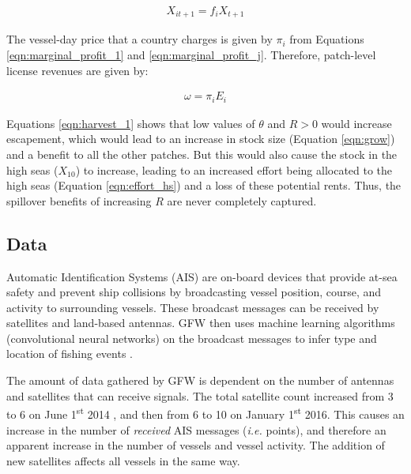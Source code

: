 \documentclass[9p,twocolumn,twoside,lineno]{pnas-new}
\begin{document}
\begin{scriptsize}
\begin{figure}[H]	
	\begin{align}
	X_{it+1} = f_iX_{t+1}
	\label{eqn:disperse}
	\end{align}
\end{figure}

The vessel-day price that a country charges is given by $\pi_i$ from Equations \ref{eqn:marginal_profit_1} and \ref{eqn:marginal_profit_j}. Therefore, patch-level license revenues are given by:

\begin{figure}[H]	
	\begin{align}
	\omega = \pi_iE_i
	\label{eqn:license_revenue}
	\end{align}
\end{figure}

Equations \ref{eqn:harvest_1} shows that low values of $\theta$ and $R > 0$ would increase escapement, which would lead to an increase in stock size (Equation \ref{eqn:grow}) and a benefit to all the other patches. But this would also cause the stock in the high seas ($X_{10}$) to increase, leading to an increased effort being allocated to the high seas (Equation \ref{eqn:effort_hs}) and a loss of these potential rents. Thus, the spillover benefits of increasing $R$ are never completely captured.

\subsection{Data}

Automatic Identification Systems (AIS) are on-board devices that provide at-sea safety and prevent ship collisions by broadcasting vessel position, course, and activity to surrounding vessels. These broadcast messages can be received by satellites and land-based antennas. GFW then uses machine learning algorithms (convolutional neural networks) on the broadcast messages to infer type and location of fishing events \citep{kroodsma_2018}.

The amount of data gathered by GFW is dependent on the number of antennas and satellites that can receive signals. The total satellite count increased from 3 to 6 on June 1\textsuperscript{st} 2014 , and then from 6 to 10 on January 1\textsuperscript{st} 2016. This causes an increase in the number of \emph{received} AIS messages (\emph{i.e.} points), and therefore an apparent increase in the number of vessels and vessel activity. The addition of new satellites affects all vessels in the same way.


\end{scriptsize}
\end{document}
